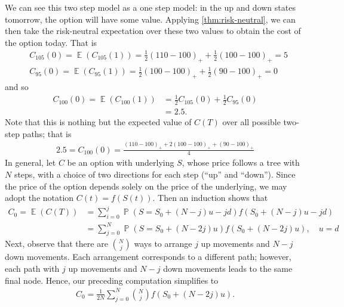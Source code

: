 \documentclass[12pt]{article}
\DeclareMathOperator{\ex}{\mathbb{E}}
\DeclareMathOperator{\prob}{\mathbb{P}}
\theoremstyle{plain}
\theoremstyle{definition}
\theoremstyle{remark}
\numberwithin{equation}{section}  %
\begin{document}
	We can see this two step model as a one step model: in the up and down states
	tomorrow, the option will have some value. Applying 
	\cref{thm:risk-neutral}, we can then take the risk-neutral 
	expectation over these two values to obtain the cost of the option today.
	That is
	\begin{equation*}
		\begin{split}
			& C_{105}(0) = \ex(C_{105}(1)) = \frac{1}{2}{(110 - 100)}_{+} +
			\frac{1}{2}{(100 - 100)}_{+} = 5
			\\
			& C_{95}(0) = \ex(C_{95}(1)) = \frac{1}{2}{(100 - 100)}_{+} +
			\frac{1}{2}{(90 - 100)}_{+} = 0
		\end{split}
	\end{equation*}
	and so
	\begin{equation*}
		\begin{split}
			C_{100}(0) = \ex(C_{100}(1))
			& = \frac{1}{2}C_{105}(0) + \frac{1}{2} C_{95}(0)
			\\
			& = 2.5.
		\end{split}
	\end{equation*}
	Note that this is nothing but the expected value
	of $C(T)$ over all possible two-step paths; that is
	\begin{equation*}
		\begin{split}
			2.5 = C_{100}(0) = \frac{{(110-100)}_{+} + 2 {(100 - 100)}_{+} + {(90 - 100)}_{+}}{4}
		\end{split}
	\end{equation*}
	In general, let $C$ be an option with underlying $S$, whose price follows
	a tree with $N$ steps, with a choice of two
	directions for each step (``up'' and ``down'').
	Since the price of the option depends solely on the price of the
	underlying, we may adopt the notation $C(t) = f(S(t))$. Then
	an induction shows that
	\begin{equation*}
		\begin{split}
			C_{0} = \ex(C(T)) & =  \sum_{i = 0}^{j}\prob(S = S_{0} + (N-j)u - jd)
			f(S_{0} + (N-j)u - jd)
			\\
			& = \sum_{j = 0}^{N}\prob(S = S_{0} + (N-2j)u)
			f(S_{0} + (N-2j)u), \quad u = d
		\end{split}
	\end{equation*}
	Next, observe that there are $\binom{N}{j}$ ways to arrange $j$ up movements and
	$N-j$ down movements. Each arrangement corresponds to a different path; however,
	each path with $j$ up movements and $N-j$ down movements leads to the same final
	node. Hence, our preceding computation simplifies to
	\begin{equation*}
		\begin{split}
			C_{0} = 	\frac{1}{2N} \sum_{j = 0}^{N} {\binom{N}{j}}f(S_{0} + (N-2j)u).
		\end{split}
	\end{equation*}
\end{document}
